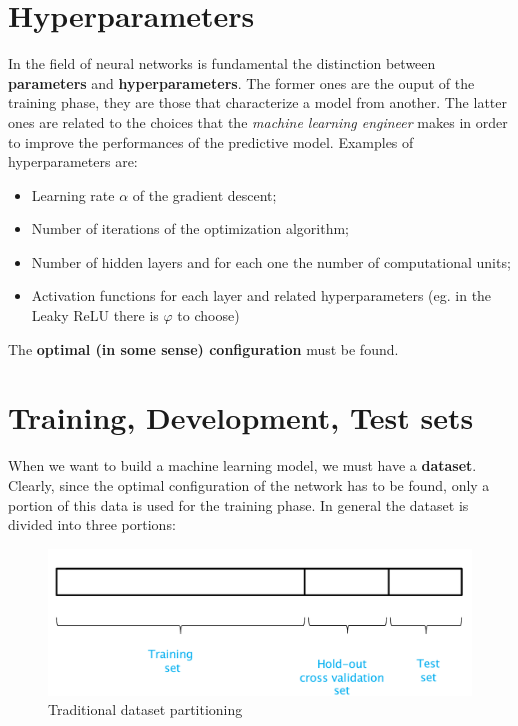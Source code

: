 \section{Hyperparameters}
In the field of neural networks is fundamental the distinction between \textbf{parameters} and \textbf{hyperparameters}. The former ones are the ouput of the training phase, they are those that characterize a model from another. The latter ones are related to the choices that the \textit{machine learning engineer} makes in order to improve the performances of the predictive model. Examples of hyperparameters are:
\begin{itemize}
    \itemsep-0.3em
    \item Learning rate $\alpha$ of the gradient descent; 
    \item Number of iterations of the optimization algorithm; 
    \item Number of hidden layers and for each one the number of computational units; 
    \item Activation functions for each layer and related hyperparameters (eg. in the Leaky ReLU there is $\varphi$ to choose)
 \end{itemize}
 The \textbf{optimal (in some sense) configuration} must be found. 

\section{Training, Development, Test sets}
When we want to build a machine learning model, we must have a \textbf{dataset}. Clearly, since the optimal configuration of the network has to be found, only a portion of this data is used for the training phase. In general the dataset is divided into three portions:
\begin{figure}[h]
    \centering
    \includegraphics[scale=0.5]{img/dataset.png}
    \caption{Traditional dataset partitioning}
\end{figure}

